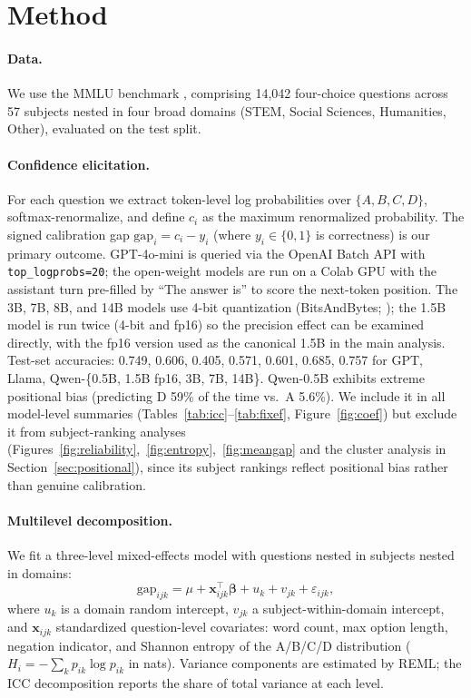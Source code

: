 \documentclass{article}
\begin{document}
\section{Method}

\paragraph{Data.}
We use the MMLU benchmark \citep{hendrycks2021measuring}, comprising 14,042
four-choice questions across 57 subjects nested in four broad domains (STEM,
Social Sciences, Humanities, Other), evaluated on the test split.

\paragraph{Confidence elicitation.}
For each question we extract token-level log probabilities over
$\{A, B, C, D\}$, softmax-renormalize, and define $c_i$ as the maximum
renormalized probability. The signed calibration gap
$\mathrm{gap}_i = c_i - y_i$ (where $y_i \in \{0, 1\}$ is correctness) is our
primary outcome. GPT-4o-mini is queried via the OpenAI Batch API with
\texttt{top\_logprobs=20}; the open-weight models are run on a Colab GPU with
the assistant turn pre-filled by ``The answer is'' to score the next-token
position. The 3B, 7B, 8B, and 14B models use 4-bit quantization (BitsAndBytes;
\citealt{dettmers2023qlora}); the 1.5B model is run twice (4-bit and fp16) so
the precision effect can be examined directly, with the fp16 version used as
the canonical 1.5B in the main analysis. Test-set accuracies: 0.749, 0.606,
0.405, 0.571, 0.601, 0.685, 0.757 for GPT, Llama, Qwen-\{0.5B, 1.5B fp16, 3B, 7B, 14B\}.
Qwen-0.5B exhibits extreme positional bias (predicting D 59\% of the time vs.\
A 5.6\%). We include it in all model-level summaries (Tables~\ref{tab:icc}--\ref{tab:fixef},
Figure~\ref{fig:coef}) but exclude it from subject-ranking analyses
(Figures~\ref{fig:reliability},~\ref{fig:entropy},~\ref{fig:meangap} and the
cluster analysis in Section~\ref{sec:positional}), since its subject rankings
reflect positional bias rather than genuine calibration.

\paragraph{Multilevel decomposition.}
We fit a three-level mixed-effects model with questions nested in subjects
nested in domains:
\begin{equation}
  \mathrm{gap}_{ijk} = \mu + \mathbf{x}_{ijk}^\top \boldsymbol{\beta}
    + u_k + v_{jk} + \varepsilon_{ijk},
\end{equation}
where $u_k$ is a domain random intercept, $v_{jk}$ a subject-within-domain
intercept, and $\mathbf{x}_{ijk}$ standardized question-level covariates: word
count, max option length, negation indicator, and Shannon entropy of the
A/B/C/D distribution ($H_i = -\sum_k p_{ik} \log p_{ik}$ in nats). Variance
components are estimated by REML; the ICC decomposition reports the share of
total variance at each level.
\end{document}
